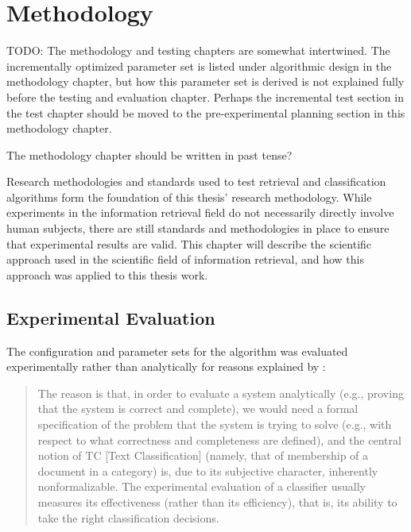 
\chapter{Methodology} %

\label{Methodology} %


\color{red}TODO: The methodology and testing chapters are somewhat intertwined. The incrementally optimized parameter set is listed under algorithmic design in the methodology chapter, but how this parameter set is derived is not explained fully before the testing and evaluation chapter. Perhaps the incremental test section in the test chapter should be moved to the pre-experimental planning section in this methodology chapter.

The methodology chapter should be written in past tense?

\color{black}

Research methodologies and standards used to test retrieval and classification algorithms form the foundation of this thesis' research methodology. While experiments in the information retrieval field do not necessarily directly involve human subjects, there are still standards and methodologies in place to ensure that experimental results are valid. This chapter will describe the scientific approach used in the scientific field of information retrieval, and how this approach was applied to this thesis work.

\section{Experimental Evaluation}
\label{ExperimentalEvaluation}
The configuration and parameter sets for the \CTC algorithm was evaluated experimentally rather than analytically for reasons explained by \cite[][32]{Sebastiani2002}:
\begin{quote}The reason is that, in order to evaluate a system analytically (e.g., proving that the system is correct and complete), we would need a formal specification of the problem that the system is trying to solve (e.g., with respect to what correctness and completeness are defined), and the central notion of TC [Text Classification] (namely, that of membership of a document in a category) is, due to its subjective character, inherently nonformalizable. The experimental evaluation of a classifier usually measures its effectiveness (rather than its efficiency), that is, its ability to take the right classification decisions.
\end{quote}

